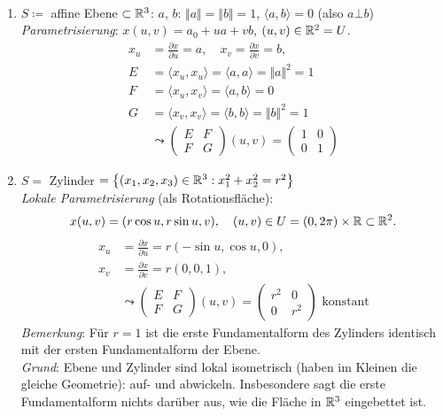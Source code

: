 \begin{example}
  \
  \begin{enumerate}

    \item $ S \coloneqq $ affine Ebene $ \subset \mathbb{R}^3 $: $ a $, $ b $: $ \Vert a \Vert = \Vert b \Vert = 1 $, $ \langle a, b \rangle = 0 $ (also $ a \bot b $) \\
    \emph{Parametrisierung}: $ x(u,v) = a_0 + ua + vb $, $ (u,v) \in \mathbb{R}^2 = U $.
    \begin{align*}
      x_u &= \frac{\partial x}{\partial u} = a, \quad x_v = \frac{\partial x}{\partial v} = b\text{,} \\
      E &= \langle x_u, x_u \rangle = \langle a, a \rangle = \Vert a \Vert^2 = 1 \\
      F &= \langle x_u, x_v \rangle = \langle a, b \rangle = 0 \\
      G &= \langle x_v, x_v \rangle = \langle b, b \rangle = \Vert b \Vert^2 = 1 \\
      &\leadsto \begin{pmatrix}
        E & F \\
        F & G
      \end{pmatrix}(u,v) = \begin{pmatrix}
        1 & 0 \\
        0 & 1
      \end{pmatrix}
    \end{align*}

    \item $ S = $ Zylinder $ = \left\{ (x_1, x_2, x_3) \in \mathbb{R}^3 : x_1^2+x_2^2 = r^2 \right\} $ \\
    \emph{Lokale Parametrisierung} (als Rotationsfläche):
    \begin{equation*}
      x(u,v) = (r \cos u, r \sin u, v), \quad (u,v) \in U = (0,2\pi) \times \mathbb{R} \subset \mathbb{R}^2\text{.}
    \end{equation*}
    \begin{align*}
      x_u &= \frac{\partial x}{\partial u} = r(-\sin u, \cos u, 0)\text{,} \\
      x_v &= \frac{\partial x}{\partial v} = r(0,0,1)\text{,} \\
        &\leadsto \begin{pmatrix}
          E & F \\
          F & G
        \end{pmatrix}(u,v) = \begin{pmatrix}
          r^2 & 0 \\
          0 & r^2
        \end{pmatrix} \text{ konstant}
    \end{align*}
    \emph{Bemerkung}: Für $ r = 1 $ ist die erste Fundamentalform des Zylinders identisch mit der ersten Fundamentalform der Ebene. \\
    \emph{Grund}: Ebene und Zylinder sind lokal isometrisch (haben im Kleinen die gleiche Geometrie): auf- und abwickeln. Insbesondere sagt die erste Fundamentalform nichts darüber aus, wie die Fläche in $ \mathbb{R}^3 $ eingebettet ist.


\end{enumerate}
\end{example}
